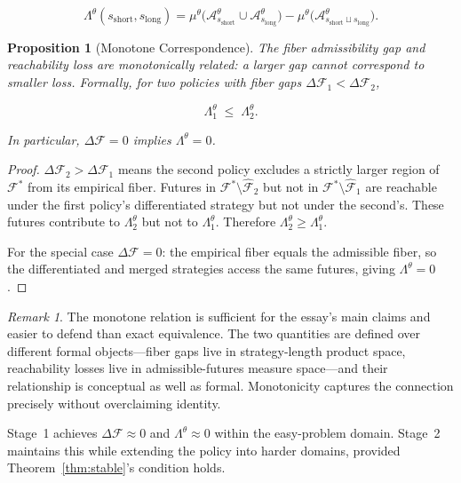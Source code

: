\documentclass[11pt]{article}
\theoremstyle{rthm}
\newtheorem{proposition}[theorem]{Proposition}
\theoremstyle{rdef}
\theoremstyle{remark}
\newtheorem*{remark}{Remark}
\begin{document}
\[
\Lambda^\theta(s_{\mathrm{short}}, s_{\mathrm{long}})
= \mu^\theta\!\bigl(
\mathcal{A}_{s_{\mathrm{short}}}^\theta \cup
\mathcal{A}_{s_{\mathrm{long}}}^\theta
\bigr)
- \mu^\theta\!\bigl(
\mathcal{A}_{s_{\mathrm{short}} \sqcup s_{\mathrm{long}}}^\theta
\bigr).
\]

\begin{proposition}[Monotone Correspondence]
\label{prop:mono}
The fiber admissibility gap and reachability loss are monotonically
related: a larger gap cannot correspond to smaller loss. Formally,
for two policies with fiber gaps $\Delta\mathcal{F}_1 <
\Delta\mathcal{F}_2$,

\[
\Lambda^\theta_1 \;\leq\; \Lambda^\theta_2.
\]

In particular, $\Delta\mathcal{F} = 0$ implies $\Lambda^\theta = 0$.
\end{proposition}

\begin{proof}
$\Delta\mathcal{F}_2 > \Delta\mathcal{F}_1$ means the second policy
excludes a strictly larger region of $\mathcal{F}^*$ from its
empirical fiber. Futures in $\mathcal{F}^* \setminus
\hat{\mathcal{F}}_2$ but not in $\mathcal{F}^* \setminus
\hat{\mathcal{F}}_1$ are reachable under the first policy's
differentiated strategy but not under the second's. These futures
contribute to $\Lambda^\theta_2$ but not to $\Lambda^\theta_1$.
Therefore $\Lambda^\theta_2 \geq \Lambda^\theta_1$.

For the special case $\Delta\mathcal{F} = 0$: the empirical fiber
equals the admissible fiber, so the differentiated and merged
strategies access the same futures, giving $\Lambda^\theta = 0$.
\end{proof}

\begin{remark}
The monotone relation is sufficient for the essay's main claims
and easier to defend than exact equivalence. The two quantities
are defined over different formal objects---fiber gaps live in
strategy-length product space, reachability losses live in
admissible-futures measure space---and their relationship is
conceptual as well as formal. Monotonicity captures the
connection precisely without overclaiming identity.
\end{remark}

Stage~1 achieves $\Delta\mathcal{F} \approx 0$ and
$\Lambda^\theta \approx 0$ within the easy-problem domain.
Stage~2 maintains this while extending the policy into harder
domains, provided Theorem~\ref{thm:stable}'s condition holds.
\end{document}
